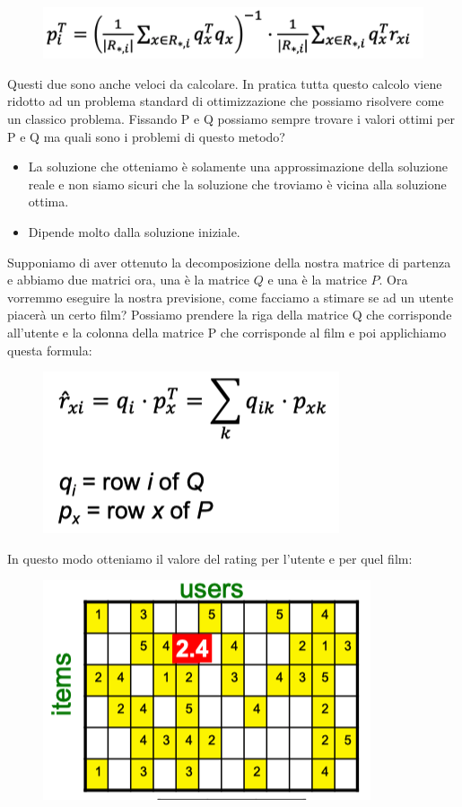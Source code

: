 \documentclass[14pt]{extreport}
\begin{document}
\begin{figure}[H]
	\centering
	\includegraphics[width=0.7\linewidth]{522.jpeg}
\end{figure}

Questi due sono anche veloci da calcolare. In pratica tutta questo calcolo viene ridotto ad un problema standard di ottimizzazione che possiamo
risolvere come un classico problema. Fissando P e Q possiamo sempre trovare i valori ottimi per P e Q ma quali sono i problemi di questo metodo?
\begin{itemize}
	\item La soluzione che otteniamo è solamente una approssimazione della soluzione reale e non siamo sicuri che la soluzione che troviamo è vicina
	alla soluzione ottima.
	\item Dipende molto dalla soluzione iniziale.
\end{itemize}

Supponiamo di aver ottenuto la decomposizione della nostra matrice di partenza e abbiamo due matrici ora, una è la matrice $Q$ e una è la matrice $P$.
Ora vorremmo eseguire la nostra previsione, come facciamo a stimare se ad un utente piacerà un certo film? Possiamo prendere la riga della matrice Q
che corrisponde all'utente e la colonna della matrice P che corrisponde al film e poi applichiamo questa formula:

\begin{figure}[H]
	\centering
	\includegraphics[width=0.7\linewidth]{523.jpeg}
\end{figure}

In questo modo otteniamo il valore del rating per l'utente e per quel film:


\begin{figure}[H]
	\centering
	\includegraphics[width=0.4\linewidth]{524.jpeg}
\end{figure}
\end{document}
